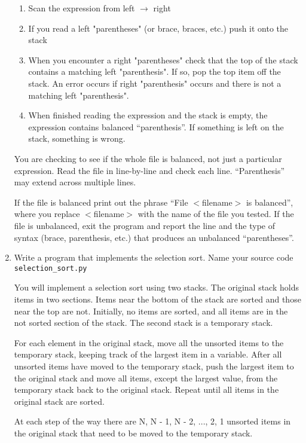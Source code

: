\documentclass[12pt]{article}
\begin{document}
\begin{enumerate}
\begin{enumerate}
  \item Scan the expression from left $\rightarrow$ right

 \item If you read a left "parentheses" (or brace, braces, etc.) push it onto the stack

 \item When you encounter a right "parentheses" check that the top of the
stack contains a matching left "parenthesis". If so, pop the top item
off the stack. An error occurs if right "parenthesis" occurs and there is not a matching left "parenthesis".

 \item When finished reading the expression and the stack is empty, the expression
contains balanced ``parenthesis''. If something is left on the stack, something is wrong.
\end{enumerate}

You are checking to see if the whole file is
balanced, not just a particular expression. Read the file in
line-by-line and check each line. ``Parenthesis'' may extend across
multiple lines.

If the file is balanced print out the phrase ``File $<$filename$>$ is
balanced'', where you replace $<$filename$>$ with the name of the file
you tested. If the file is unbalanced, exit the program and report the
line and the type of syntax (brace, parenthesis, etc.) that produces an unbalanced ``parentheses''.


\item Write a program that implements the selection sort. Name your source code \\\texttt{selection\_sort.py}

You will implement a selection sort using two stacks. The original stack holds items in two sections. Items near the bottom of the stack are sorted and those near the top are not. Initially, no items are sorted, and all items are in the not sorted section of the stack. The second stack is a temporary stack. 
  
For each element in the original stack, move all the unsorted items to the temporary stack, keeping track of the largest item in a variable. After all unsorted items have moved to the temporary stack, push the largest item to the original stack and move all items, except the largest value, from the temporary stack back to the original stack. Repeat until all items in the original stack are sorted. 
  
At each step of the way there are N, N - 1, N - 2, ..., 2, 1 unsorted items in the original stack that need to be moved to the temporary stack.



\end{enumerate}
\end{document}
